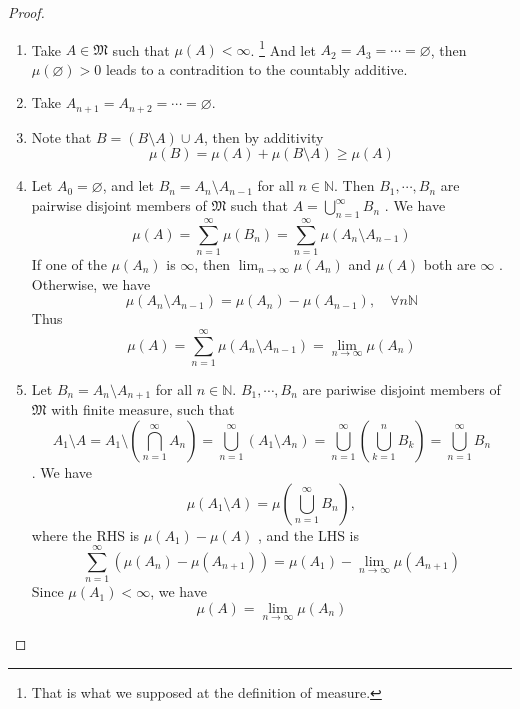 \documentclass[../main.tex]{subfiles}
\begin{document}
\begin{proof}
    \begin{enumerate}
        \item Take \(  A \in \mathfrak{M}   \) such that  \(  \mu \left( A \right)< \infty   \). \footnote{That is what we supposed at the definition of measure.}  And let \(  A_2= A_3= \cdots = \varnothing  \), then \(  \mu \left( \varnothing \right)> 0   \) leads to a contradition to the countably additive.  
        \item Take \(  A_{n+ 1}= A_{n+ 2}= \cdots = \varnothing  \).
        \item Note that \(  B=\left( B\setminus A \right) \cup A  \), then   by additivity \[
        \mu \left( B \right)= \mu \left( A \right)+ \mu \left( B\setminus A \right)\ge \mu \left( A \right)    
        \] 
        \item Let \(  A_0= \varnothing  \), and let \(  B_{n}=  A_{n}\setminus A_{n-1}  \) for all  \(  n\in \mathbb{N}   \). Then \(  B_1,\cdots ,B_{n}  \) are pairwise disjoint members of \(  \mathfrak{M}  \) such that \(  A=  \bigcup _{n = 1}^{\infty}B_{n}  \)  . We have \[
        \mu \left( A \right)=  \sum _{n = 1}^{\infty}\mu \left( B_{n} \right)= \sum _{n = 1}^{\infty}\mu \left( A_{n}\setminus A_{n-1} \right)   
        \]    If one of the \(  \mu \left( A_{n} \right)   \) is \(  \infty  \), then \(  \lim_{n\to \infty}\mu \left( A_{n} \right)   \) and \(  \mu \left( A \right)   \) both are \(  \infty  \) . Otherwise, we have \[
        \mu \left( A_{n}\setminus A_{n-1} \right)= \mu \left( A_{n} \right)-\mu \left( A_{n-1} \right),\quad \forall n   \mathbb{N} 
        \] Thus \[
      \mu \left( A \right)=    \sum _{n = 1}^{\infty}\mu \left( A_{n}\setminus A_{n-1} \right)= \lim_{n\to \infty}\mu \left( A_{n} \right)  
        \]
        \item Let \(  B_{n}=  A_{n}\setminus A_{n+ 1}  \) for all \( n \in \mathbb{N}    \).   \(  B_1,\cdots ,B_{n}  \) are pariwise disjoint members of \(  \mathfrak{M}  \) with finite measure, such that\[
        A_1\setminus A= A_1\setminus \left( \bigcap_{n = 1}^{\infty}A_{n}  \right) = \bigcup _{n = 1}^{\infty}\left( A_1\setminus A_{n} \right)= \bigcup _{n = 1}^{\infty}\left( \bigcup _{k = 1}^{n}B_{k} \right) = \bigcup _{n = 1}^{\infty}B_{n}
        \] . We have \[
       \mu  \left( A_1\setminus A \right)=  \mu \left( \bigcup _{n = 1}^{\infty}B_{n} \right) , 
        \]   where the RHS is \(  \mu \left( A_1 \right)-\mu \left( A \right)    \) , and the LHS is \[
        \sum _{n = 1}^{\infty}\left( \mu \left( A_{n} \right)-\mu \left( A_{n+ 1} \right)   \right)= \mu \left( A_1 \right)-\lim_{n\to \infty}\mu \left( A_{n+ 1} \right)    
        \]Since \(  \mu \left( A_1 \right)< \infty   \), we have \[
        \mu \left( A \right)= \lim_{n\to \infty}\mu \left( A_{n} \right)  
        \] 
    \end{enumerate}
    
\end{proof}
\end{document}

